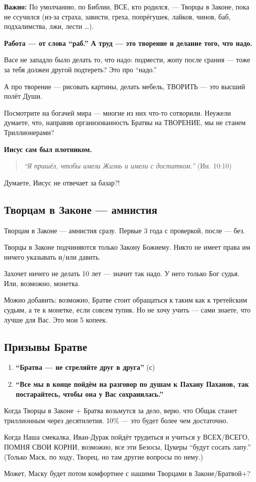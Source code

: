 \documentclass[11pt,a4paper]{article}
\theoremstyle{definition}
\theoremstyle{remark}
\begin{document}
{\textbf{Важно:} По умолчанию, по Библии, ВСЕ, кто родился, — Творцы в Законе, 
пока не ссучился (из-за страха, зависти, греха, попрёгушек, лайков, чинов, баб, 
подхалимства, лжи, лести \ldots).

\textbf{Работа — от слова ``раб.'' А труд — это творение и делание того, что надо.}

Васе не западло было делать то, что надо: подмести, жопу после срания — тоже за 
тебя должен другой подтереть? Это про ``надо.''

А про творение — рисовать картины, делать мебель, ТВОРИТЬ — это высший полёт Души.

Посмотрите на богачей мира — многие из них что-то сотворили. Неужели думаете, что, 
направив организованность Братвы на ТВОРЕНИЕ, мы не станем Триллионерами?

\textbf{Иисус сам был плотником.}

\begin{quote}
\textit{``Я пришёл, чтобы имели Жизнь и имели с достатком.''} (Ин. 10:10)
\end{quote}

Думаете, Иисус не отвечает за базар?!

\subsection{Творцам в Законе — амнистия}

Творцам в Законе — амнистия сразу. Первые 3 года с проверкой, после — без.

Творцы в Законе подчиняются только Закону Божиему. Никто не имеет права им ничего 
указывать и/или давить.

Захочет ничего не делать 10 лет — значит так надо. У него только Бог судья. Или, 
возможно, монетка.

Можно добавить: возможно, Братве стоит обращаться к таким как к третейским судьям, 
а те к монетке, если совсем тупик. Но не хочу учить — сами знаете, что лучше для 
Вас. Это мои 5 копеек.

\subsection{Призывы Братве}

\begin{enumerate}
\item \textbf{``Братва — не стреляйте друг в друга''} (с)
\item \textbf{``Все мы в конце пойдём на разговор по душам к Пахану Паханов, так 
постарайтесь, чтобы она у Вас сохранилась.''}
\end{enumerate}

Когда Творцы в Законе + Братва возьмутся за дело, верю, что Общак станет триллионным 
через десятилетия. 10\% — это будет более чем достаточно.

Когда Наша смекалка, Иван-Дурак пойдёт трудиться и учиться у ВСЕХ/ВСЕГО, ПОМНЯ СВОИ 
КОРНИ, возможно, все эти Безосы, Цукеры ``будут сосать лапу.'' (Только Маск, по ходу, 
Творец, но там другие вопросы по нему.)

Может, Маску будет потом комфортнее с нашими Творцами в Законе/Братвой+?

} %
\end{document}
